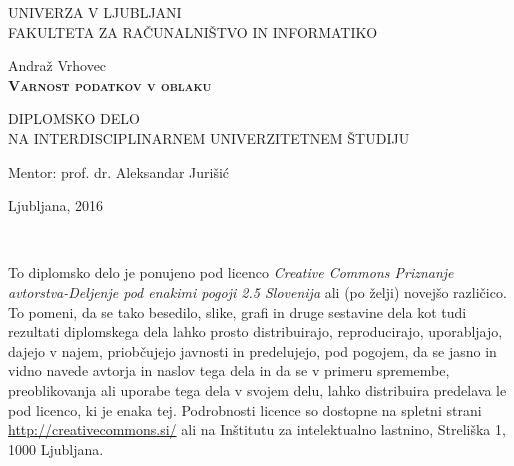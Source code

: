 \documentclass[12pt,a4paper,openany]{book}
\begin{document}
\thispagestyle{empty}

\begin{center}
{\large
UNIVERZA V LJUBLJANI\\
FAKULTETA ZA RAČUNALNIŠTVO IN INFORMATIKO\\
}

\vspace{3cm}
{\LARGE Andraž Vrhovec}\\

\vspace{2cm}
\textsc{\textbf{\LARGE
Varnost podatkov v oblaku
}}

\vspace{2cm}
{ DIPLOMSKO DELO}\\
{ NA INTERDISCIPLINARNEM UNIVERZITETNEM ŠTUDIJU
}


\vspace{2cm}
{\Large Mentor: prof. dr. Aleksandar Jurišić}

\vfill
{\Large Ljubljana, 2016}
\end{center}

\newpage

\ \thispagestyle{empty}

\newpage


\thispagestyle{empty}

\vspace*{5cm}
{\small \noindent
To diplomsko delo je ponujeno pod licenco \textit{Creative Commons Priznanje avtorstva-Deljenje pod enakimi pogoji 2.5 Slovenija}
ali (po želji) novejšo različico.
To pomeni, da se tako besedilo, slike, grafi in druge sestavine dela kot tudi rezultati diplomskega dela lahko prosto distribuirajo,
reproducirajo, uporabljajo, dajejo v najem, priobčujejo javnosti in predelujejo, pod pogojem, da se jasno in vidno navede avtorja in naslov tega
dela in da se v primeru spremembe, preoblikovanja ali uporabe tega dela v svojem delu, lahko distribuira predelava le pod
licenco, ki je enaka tej.
Podrobnosti licence so dostopne na spletni strani \url{http://creativecommons.si/} ali na Inštitutu za
intelektualno lastnino, Streliška 1, 1000 Ljubljana.

\begin{center}%
  \hspace*{1ex}
\end{center}
}
\end{document}
